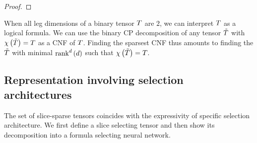 \begin{proof}
\end{proof}



\begin{example}
	When all leg dimensions of a binary tensor $T$ are $2$, we can interpret $T$ as a logical formula.
	We can use the binary CP decomposition of any tensor $\tilde{T}$ with $\chi\left(\tilde{T}\right)=T$ as a CNF of $T$.
	Finding the sparsest CNF thus amounts to finding the $\tilde{T}$ with minimal $\mathrm{rank}^{d}\left(d\right)$ such that $\chi\left(\tilde{T}\right)=T$.
\end{example}






\subsection{Representation involving selection architectures}

The set of slice-sparse tensors coincides with the expressivity of specific selection architecture.
We first define a slice selecting tensor and then show its decomposition into a formula selecting neural network.


